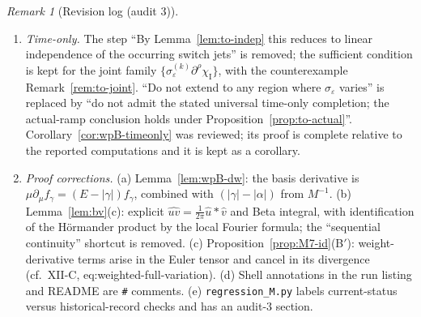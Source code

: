 \documentclass{article}
\theoremstyle{remark}
\newtheorem{remark}[proposition]{Remark}
\newcommand{\sigeps}{\sigma_\varepsilon}
\newcommand{\chiI}{\chi_{\mathrm I}}
\begin{document}
\begin{remark}[Revision log (audit 3)]
\begin{enumerate}
\item \emph{Time-only.} The step ``By Lemma~\ref{lem:to-indep} this reduces to linear independence of the occurring switch jets'' is removed; the sufficient condition is kept for the joint family $\{\sigeps^{(k)}\partial^\rho\chiI\}$, with the counterexample Remark~\ref{rem:to-joint}. ``Do not extend to any region where $\sigeps$ varies'' is replaced by ``do not admit the stated universal time-only completion; the actual-ramp conclusion holds under Proposition~\ref{prop:to-actual}''. Corollary~\ref{cor:wpB-timeonly} was reviewed; its proof is complete relative to the reported computations and it is kept as a corollary.
\item \emph{Proof corrections.} (a) Lemma~\ref{lem:wpB-dw}: the basis derivative is $\mu\partial_\mu f_\gamma=(E-|\gamma|)f_\gamma$, combined with $(|\gamma|-|\alpha|)$ from $M^{-1}$. (b) Lemma~\ref{lem:bv}(c): explicit $\widehat{uv}=\frac1{2\pi}\hat u*\hat v$ and Beta integral, with identification of the H\"ormander product by the local Fourier formula; the ``sequential continuity'' shortcut is removed. (c) Proposition~\ref{prop:M7-id}(B$'$): weight-derivative terms arise in the Euler tensor and cancel in its divergence (cf.\ XII-C, eq:weighted-full-variation). (d) Shell annotations in the run listing and README are \texttt{\#} comments. (e) \texttt{regression\_M.py} labels current-status versus historical-record checks and has an audit-3 section.
\end{enumerate}
\end{remark}
\end{document}
